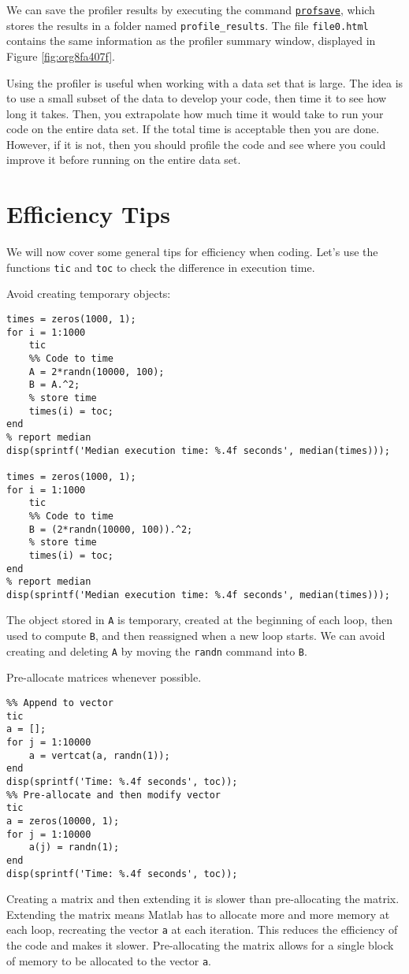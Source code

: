 \documentclass[12pt, a4paper]{article}
\begin{document}
We can save the profiler results by executing the command \href{https://www.mathworks.com/help/matlab/ref/profsave.html?s\_tid=doc\_ta}{\texttt{profsave}}, which stores the results in a folder named \texttt{profile\_results}.
The file \texttt{file0.html} contains the same information as the profiler summary window, displayed in Figure \ref{fig:org8fa407f}.

Using the profiler is useful when working with a data set that is large.
The idea is to use a small subset of the data to develop your code, then time it to see how long it takes.
Then, you extrapolate how much time it would take to run your code on the entire data set.
If the total time is acceptable then you are done.
However, if it is not, then you should profile the code and see where you could improve it before running on the entire data set.
\section{Efficiency Tips}
\label{sec:org6768268}
We will now cover some general tips for efficiency when coding.
Let's use the functions \texttt{tic} and \texttt{toc} to check the difference in execution time.

Avoid creating temporary objects:
\lstset{language=matlab,label= ,caption= ,captionpos=b,firstnumber=1,numbers=left,style=Matlab-editor}
\begin{lstlisting}
times = zeros(1000, 1);
for i = 1:1000
    tic
    %% Code to time
    A = 2*randn(10000, 100);
    B = A.^2;
    % store time
    times(i) = toc;
end
% report median
disp(sprintf('Median execution time: %.4f seconds', median(times)));

times = zeros(1000, 1);
for i = 1:1000
    tic
    %% Code to time
    B = (2*randn(10000, 100)).^2;
    % store time
    times(i) = toc;
end
% report median
disp(sprintf('Median execution time: %.4f seconds', median(times)));
\end{lstlisting}
The object stored in \texttt{A} is temporary, created at the beginning of each loop, then used to compute \texttt{B}, and then reassigned when a new loop starts.
We can avoid creating and deleting \texttt{A} by moving the \texttt{randn} command into \texttt{B}.

Pre-allocate matrices whenever possible.
\lstset{language=matlab,label= ,caption= ,captionpos=b,firstnumber=1,numbers=left,style=Matlab-editor}
\begin{lstlisting}
%% Append to vector
tic
a = [];
for j = 1:10000
    a = vertcat(a, randn(1));
end
disp(sprintf('Time: %.4f seconds', toc));
%% Pre-allocate and then modify vector
tic
a = zeros(10000, 1);
for j = 1:10000
    a(j) = randn(1);
end
disp(sprintf('Time: %.4f seconds', toc));
\end{lstlisting}
Creating a matrix and then extending it is slower than pre-allocating the matrix.
Extending the matrix means Matlab has to allocate more and more memory at each loop, recreating the vector \texttt{a} at each iteration.
This reduces the efficiency of the code and makes it slower.
Pre-allocating the matrix allows for a single block of memory to be allocated to the vector \texttt{a}.
\end{document}
